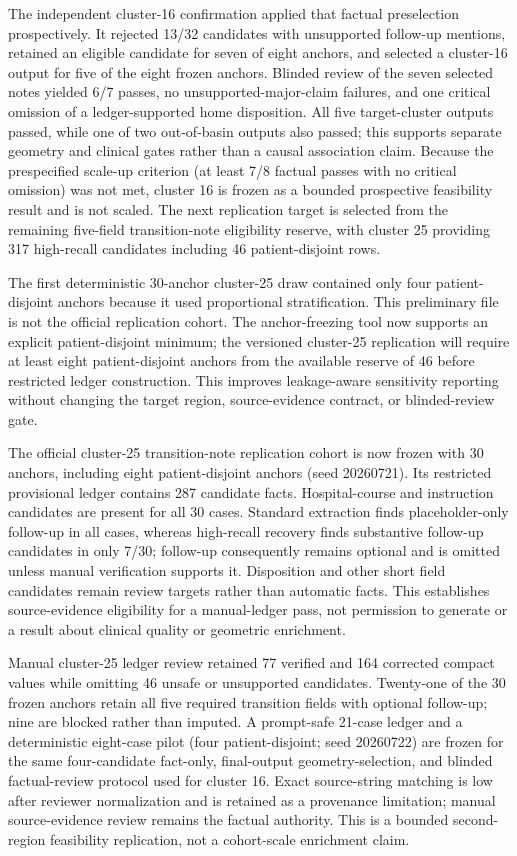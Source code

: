 \documentclass[11pt]{article}
\begin{document}
The independent cluster-16 confirmation applied that factual preselection prospectively. It rejected 13/32 candidates with unsupported follow-up mentions, retained an eligible candidate for seven of eight anchors, and selected a cluster-16 output for five of the eight frozen anchors. Blinded review of the seven selected notes yielded 6/7 passes, no unsupported-major-claim failures, and one critical omission of a ledger-supported home disposition. All five target-cluster outputs passed, while one of two out-of-basin outputs also passed; this supports separate geometry and clinical gates rather than a causal association claim. Because the prespecified scale-up criterion (at least 7/8 factual passes with no critical omission) was not met, cluster 16 is frozen as a bounded prospective feasibility result and is not scaled. The next replication target is selected from the remaining five-field transition-note eligibility reserve, with cluster 25 providing 317 high-recall candidates including 46 patient-disjoint rows.

The first deterministic 30-anchor cluster-25 draw contained only four patient-disjoint anchors because it used proportional stratification. This preliminary file is not the official replication cohort. The anchor-freezing tool now supports an explicit patient-disjoint minimum; the versioned cluster-25 replication will require at least eight patient-disjoint anchors from the available reserve of 46 before restricted ledger construction. This improves leakage-aware sensitivity reporting without changing the target region, source-evidence contract, or blinded-review gate.

The official cluster-25 transition-note replication cohort is now frozen with 30 anchors, including eight patient-disjoint anchors (seed 20260721). Its restricted provisional ledger contains 287 candidate facts. Hospital-course and instruction candidates are present for all 30 cases. Standard extraction finds placeholder-only follow-up in all cases, whereas high-recall recovery finds substantive follow-up candidates in only 7/30; follow-up consequently remains optional and is omitted unless manual verification supports it. Disposition and other short field candidates remain review targets rather than automatic facts. This establishes source-evidence eligibility for a manual-ledger pass, not permission to generate or a result about clinical quality or geometric enrichment.

Manual cluster-25 ledger review retained 77 verified and 164 corrected compact values while omitting 46 unsafe or unsupported candidates. Twenty-one of the 30 frozen anchors retain all five required transition fields with optional follow-up; nine are blocked rather than imputed. A prompt-safe 21-case ledger and a deterministic eight-case pilot (four patient-disjoint; seed 20260722) are frozen for the same four-candidate fact-only, final-output geometry-selection, and blinded factual-review protocol used for cluster 16. Exact source-string matching is low after reviewer normalization and is retained as a provenance limitation; manual source-evidence review remains the factual authority. This is a bounded second-region feasibility replication, not a cohort-scale enrichment claim.
\end{document}
